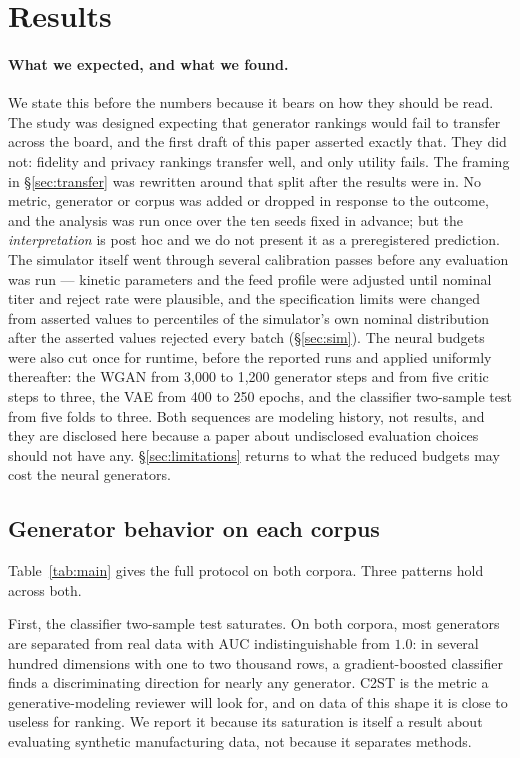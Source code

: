 \documentclass[11pt]{article}
\begin{document}
\section{Results}
\label{sec:results}

\paragraph{What we expected, and what we found.} We state this before the
numbers because it bears on how they should be read. The study was designed
expecting that generator rankings would fail to transfer across the board, and
the first draft of this paper asserted exactly that. They did not: fidelity and
privacy rankings transfer well, and only utility fails. The framing in
\S\ref{sec:transfer} was rewritten around that split after the results were in.
No metric, generator or corpus was added or dropped in response to the outcome,
and the analysis was run once over the ten seeds fixed in advance; but the
\emph{interpretation} is post hoc and we do not present it as a preregistered
prediction. The simulator itself went through several calibration passes before
any evaluation was run --- kinetic parameters and the feed profile were adjusted
until nominal titer and reject rate were plausible, and the specification limits
were changed from asserted values to percentiles of the simulator's own nominal
distribution after the asserted values rejected every batch
(\S\ref{sec:sim}). The neural budgets were also cut once for runtime, before the reported runs and
applied uniformly thereafter: the WGAN from 3{,}000 to 1{,}200 generator steps
and from five critic steps to three, the VAE from 400 to 250 epochs, and the
classifier two-sample test from five folds to three. Both sequences are modeling
history, not results, and they are disclosed here because a paper about
undisclosed evaluation choices should not have any. \S\ref{sec:limitations}
returns to what the reduced budgets may cost the neural generators.

\subsection{Generator behavior on each corpus}

Table~\ref{tab:main} gives the full protocol on both corpora. Three patterns hold
across both.

First, the classifier two-sample test saturates. On both corpora, most generators
are separated from real data with AUC indistinguishable from $1.0$: in several
hundred dimensions with one to two thousand rows, a gradient-boosted classifier
finds a discriminating direction for nearly any generator. C2ST is the metric a
generative-modeling reviewer will look for, and on data of this shape it is
close to useless for ranking. We report it because its saturation is itself a
result about evaluating synthetic manufacturing data, not because it separates
methods.
\end{document}
